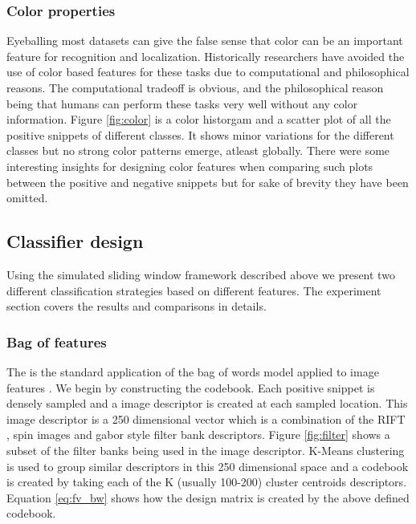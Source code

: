 \documentclass[10pt,twocolumn,letterpaper]{article}
\begin{document}

\subsubsection{Color properties}

Eyeballing most datasets can give the false sense that color can be an important feature for recognition
and localization. Historically researchers have avoided the use of color based features for these tasks due to computational
and philosophical reasons. The computational tradeoff is obvious, and the philosophical reason being that humans
can perform these tasks very well without any color information. Figure \ref{fig:color} is a color historgam and a scatter plot of
all the positive snippets of different classes. It shows minor variations for the different classes but no strong
color patterns emerge, atleast globally. There were some interesting insights for designing color features 
when comparing such plots between the positive and negative snippets but for sake of brevity they have been omitted.


\subsection{Classifier design}

Using the simulated sliding window framework described above we present two
different classification strategies based on different features. The experiment
section covers the results and comparisons in details.


\subsubsection{Bag of features}

The is the standard application of the bag of words model applied to image features \cite{bag1,bag2}.
We begin by constructing the codebook. Each positive snippet is densely sampled and a image descriptor
is created at each sampled location. This image descriptor is a 250 dimensional vector which is a combination of the RIFT \cite{feature2}, 
spin images \cite{feature3} and gabor style filter bank \cite{feature4} descriptors. Figure \ref{fig:filter} shows a subset of the filter
banks being used in the image descriptor.
K-Means clustering is used to group similar descriptors in this 250 dimensional space and a codebook is created
by taking each of the K (usually 100-200) cluster centroids descriptors. Equation \ref{eq:fv_bw} shows how the
design matrix is created by the above defined codebook. 
\end{document}
